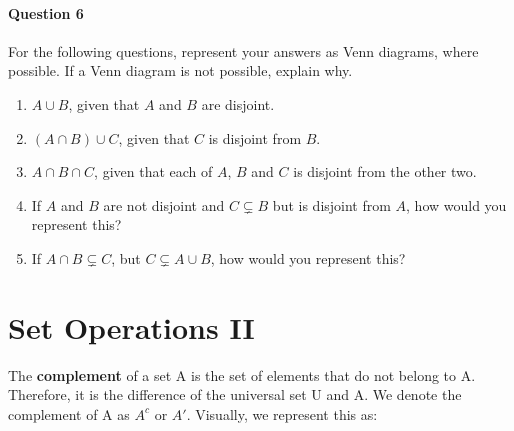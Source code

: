 \paragraph{Question 6}
For the following questions, represent your answers as Venn diagrams, where possible. If a Venn diagram is not possible, explain why.
\begin{enumerate}
    
    \item $A \cup B$, given that $A$ and $B$ are disjoint.
    \vspace{8em}
    
    \item $(A\cap B)\cup C$, given that $C$ is disjoint from $B$.
    \vspace{8em}
    
    \item $A\cap B \cap C$, given that each of $A$, $B$ and $C$ is disjoint from the other two.
    \vspace{8em}
    
    \item If $A$ and $B$ are not disjoint and $C \subsetneq B$ but is disjoint from $A$, how would you represent this? 
    \vspace{8em}
    
    \item If $A \cap B \subsetneq C$, but $C \subsetneq A \cup B$, how would you represent this?
    \vspace{8em}
    
    
\end{enumerate}









\section{Set Operations II}

\begin{definition}
The \textbf{complement} of a set A is the set of elements that do not belong to A. Therefore, it is the difference of the universal set U and A. We denote the complement of A as $A^c$ or $A'$. Visually, we represent this as:


\end{definition}


